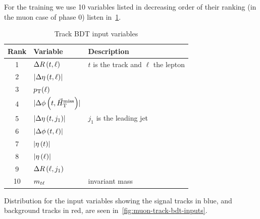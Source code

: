 For the training we use 10 variables listed in decreasing order of their ranking (in the muon case of phase 0) listen in~\ref{tab:track-bdt-variables}.

\begin{table}[!htb]
	\centering
	\label{tab:track-bdt-variables}
		\caption{Track BDT input variables}
			\begin{tabular}{cll} \hline
			Rank & Variable & Description \\ \hline
			1 & $\Delta R\left(t, \ell\right)$ & $t$ is the track and $\ell$ the lepton\\
			2 & $\lvert \Delta \eta \left(t, \ell\right)  \rvert$ & \\
			3 & $p_{\mathrm{T}}(\ell)$ & \\
			
			4 & $\lvert \Delta\phi\left(t, \vec{H}_{\text{T}}^{\text{miss}} \right) \rvert$ & \\
			5 & $\lvert \Delta\eta\left(t, j_1 \right) \rvert$ & $j_1$ is the leading jet\\
			6 & $\lvert \Delta\phi\left(t, \ell \right) \rvert$ & \\
			7 & $\lvert \eta\left(t\right) \rvert$ & \\
			8 & $\lvert \eta\left(\ell\right) \rvert$ & \\
			9 & $\Delta R\left(\ell, j_1\right)$ & \\
			10 & $m_{t\ell}$ & invariant mass \\ 
			\hline
			\end{tabular}
\end{table}

Distribution for the input variables showing the signal tracks in blue, and background tracks in red, are seen in~\ref{fig:muon-track-bdt-inputs}.

